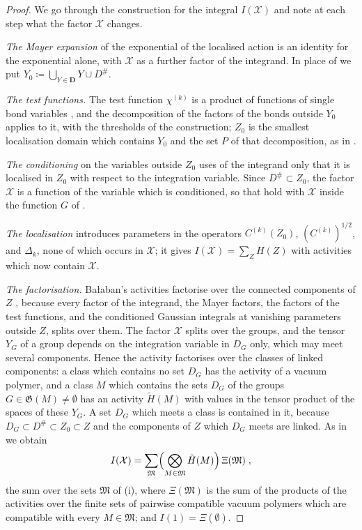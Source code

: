 \documentclass[11pt]{preprint}
\numberwithin{equation}{section}
\theoremstyle{definition}
\theoremstyle{remark}
\theoremstyle{plain}
\begin{document}
\begin{proof}
We go through the construction \cite[(2.1)--(2.11), pp.~11--14]{BalabanRG2} for the integral $I(\mathcal X)$ and note at each step what the factor $\mathcal X$ changes.

\emph{The Mayer expansion} \cite[(2.1)]{BalabanRG2} of the exponential of the localised action is an identity for the exponential alone, with $\mathcal X$ as a further factor of the integrand. In place of \cite[(2.2)]{BalabanRG2} we put $Y_0 \coloneqq \bigcup_{Y \in \mathbf D}Y \cup D^{\#}$.

\emph{The test functions.} The test function $\chi^{(k)}$ is a product of functions of single bond variables \cite[(3.16), p.~268]{BalabanCRE}, and the decomposition \cite[(2.3)]{BalabanRG2} of the factors of the bonds outside $Y_0$ applies to it, with the thresholds of the construction; $Z_0$ is the smallest localisation domain which contains $Y_0$ and the set $P$ of that decomposition, as in \cite[p.~12]{BalabanRG2}.

\emph{The conditioning} \cite[(2.4)--(2.6)]{BalabanRG2} on the variables outside $Z_0$ uses of the integrand only that it is localised in $Z_0$ with respect to the integration variable. Since $D^{\#} \subset Z_0$, the factor $\mathcal X$ is a function of the variable which is conditioned, so that \cite[(2.5), (2.6)]{BalabanRG2} hold with $\mathcal X$ inside the function $G$ of \cite[(2.6)]{BalabanRG2}.

\emph{The localisation} \cite[(2.8), (2.9)]{BalabanRG2} introduces parameters in the operators $C^{(k)}(Z_0)$, $(C^{(k)})^{1/2}$, and $\Delta_k$, none of which occurs in $\mathcal X$; it gives $I(\mathcal X) = \sum_ZH(Z)$ with activities which now contain $\mathcal X$.

\emph{The factorisation.} Ba{\l}aban's activities factorise over the connected components of $Z$ \cite[(2.10)]{BalabanRG2}, because every factor of the integrand, the Mayer factors, the factors of the test functions, and the conditioned Gaussian integrals at vanishing parameters outside $Z$, splits over them. The factor $\mathcal X$ splits over the groups, and the tensor $Y_G$ of a group depends on the integration variable in $D_G$ only, which may meet several components. Hence the activity factorises over the classes of linked components: a class which contains no set $D_G$ has the activity of a vacuum polymer, and a class $M$ which contains the sets $D_G$ of the groups $G \in \mathfrak G(M) \neq \emptyset$ has an activity $\tilde H(M)$ with values in the tensor product of the spaces of these $Y_G$. A set $D_G$ which meets a class is contained in it, because $D_G \subset D^{\#} \subset Z_0 \subset Z$ and the components of $Z$ which $D_G$ meets are linked. As in \cite[(2.11)]{BalabanRG2} we obtain
\begin{equation}\label{eq:marked-polymer-sum}
    I(\mathcal X) = \sum_{\mathfrak M}\Bigl(\bigotimes_{M \in \mathfrak M}\tilde H(M)\Bigr)\,\Xi(\mathfrak M)\;,
\end{equation}
the sum over the sets $\mathfrak M$ of (i), where $\Xi(\mathfrak M)$ is the sum of the products of the activities over the finite sets of pairwise compatible vacuum polymers which are compatible with every $M \in \mathfrak M$; and $I(1) = \Xi(\emptyset)$.


\end{proof}
\end{document}
